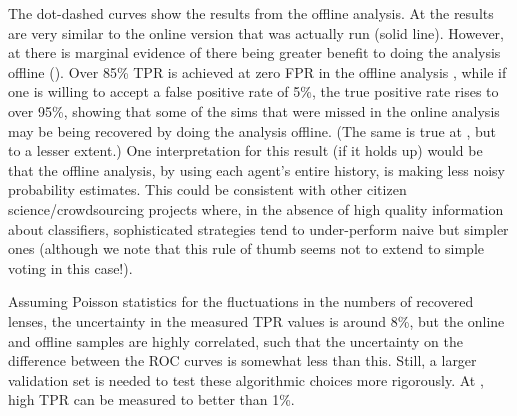 \documentclass[useAMS,usenatbib,a4paper]{mn2e}
\begin{document}
The dot-dashed curves show the results from the offline analysis. At \StageOne the
results are very similar to the online version that was actually run (solid
line). However, at \StageTwo there is marginal evidence of there being greater
benefit to doing the analysis offline ().
Over 85\% TPR is achieved at zero FPR in the offline analysis , while if one is
willing to accept a false positive rate of 5\%, the true positive rate rises to
over 95\%, showing that some of the sims that were missed in the online analysis
may be being recovered by doing the analysis offline. (The same is true at
\StageOne, but to a lesser extent.) One interpretation for this result (if it holds up)
would be that the offline analysis, by using each agent's entire history, is
making less noisy probability estimates. This could be consistent with
other citizen science/crowdsourcing projects where,
in the absence of high quality information about classifiers,
sophisticated strategies tend to under-perform naive but simpler
ones \citep{Waterhouse} (although we note that this rule of thumb seems not to extend
to simple voting in this case!).

Assuming Poisson statistics for the
fluctuations in the numbers of recovered lenses, the uncertainty in the measured
\StageTwo TPR values is around 8\%, but the online and offline samples are
highly correlated, such that the uncertainty on the difference between the ROC
curves is somewhat less than this.
Still, a larger validation set is needed to
test these algorithmic choices more rigorously. At \StageOne, high TPR can be
measured to better than 1\%.
\end{document}
